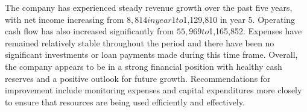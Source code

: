 

The company has experienced steady revenue growth over the past five years, with net income increasing from $8,814 in year 1 to $1,129,810 in year 5. Operating cash flow has also increased significantly from $55,969 to $1,165,852. Expenses have remained relatively stable throughout the period and there have been no significant investments or loan payments made during this time frame. Overall, the company appears to be in a strong financial position with healthy cash reserves and a positive outlook for future growth. Recommendations for improvement include monitoring expenses and capital expenditures more closely to ensure that resources are being used efficiently and effectively.